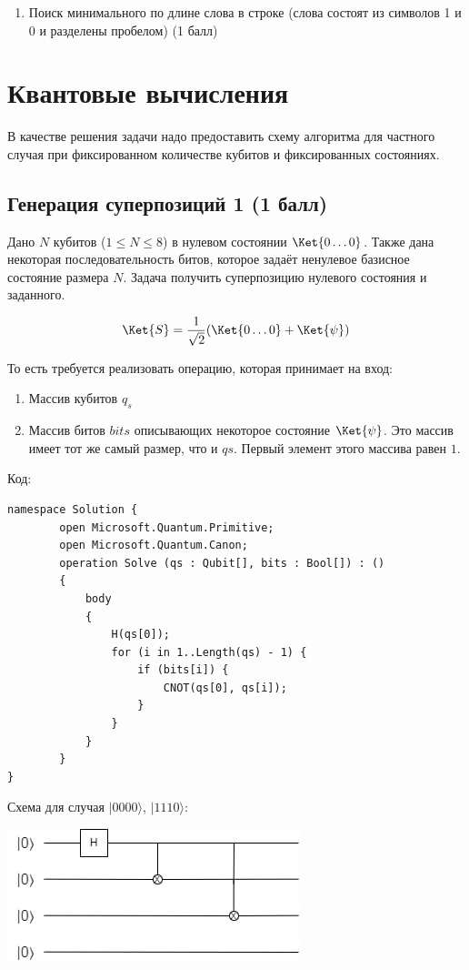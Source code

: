 \documentclass[a4paper,12pt]{article}
\begin{document}
\begin{enumerate}
    \item Поиск минимального по длине слова в строке (слова состоят из символов 1 и 0 и разделены пробелом) (1 балл)
\end{enumerate}


\section{Квантовые вычисления}


В качестве решения задачи надо предоставить схему алгоритма для частного случая при фиксированном количестве кубитов и фиксированных состояниях. 


\subsection{Генерация суперпозиций 1 (1 балл)}

Дано $N$ кубитов ($1 \le N \le 8$) в нулевом состоянии $\Ket{0\dots0}$. Также дана некоторая последовательность битов, которое задаёт ненулевое базисное состояние размера $N$. Задача получить суперпозицию нулевого состояния и заданного.

$$\Ket{S} = \frac{1}{\sqrt2}(\Ket{0\dots0} +\Ket{\psi})$$

То есть требуется реализовать операцию, которая принимает на вход:

\begin{enumerate}
    \item Массив кубитов $q_s$
    \item Массив битов $bits$ описывающих некоторое состояние $\Ket{\psi}$. Это массив имеет тот же самый размер, что и $qs$. Первый элемент этого массива равен $1$.
\end{enumerate}


Код:
\begin{lstlisting}
namespace Solution {
        open Microsoft.Quantum.Primitive;
        open Microsoft.Quantum.Canon;
        operation Solve (qs : Qubit[], bits : Bool[]) : ()
        {
            body
            {
                H(qs[0]);
                for (i in 1..Length(qs) - 1) {
                    if (bits[i]) {
                        CNOT(qs[0], qs[i]); 
                    } 
                } 
            }
        }
}
\end{lstlisting}

Схема для случая \(|0 0 0 0 \rangle\), \(|1 1 1 0 \rangle\): 
        \begin{center}
            \includegraphics[scale=1]{31hw3.jpg}
        \end{center}
\end{document}
